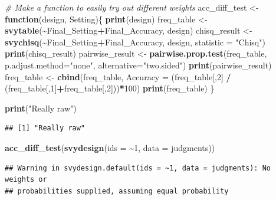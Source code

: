 \documentclass[
]{article}
\newenvironment{Shaded}{\begin{snugshade}}{\end{snugshade}}
\newcommand{\AttributeTok}[1]{\textcolor[rgb]{0.13,0.29,0.53}{#1}}
\newcommand{\CommentTok}[1]{\textcolor[rgb]{0.56,0.35,0.01}{\textit{#1}}}
\newcommand{\ControlFlowTok}[1]{\textcolor[rgb]{0.13,0.29,0.53}{\textbf{#1}}}
\newcommand{\DecValTok}[1]{\textcolor[rgb]{0.00,0.00,0.81}{#1}}
\newcommand{\FunctionTok}[1]{\textcolor[rgb]{0.13,0.29,0.53}{\textbf{#1}}}
\newcommand{\NormalTok}[1]{#1}
\newcommand{\OtherTok}[1]{\textcolor[rgb]{0.56,0.35,0.01}{#1}}
\newcommand{\SpecialCharTok}[1]{\textcolor[rgb]{0.81,0.36,0.00}{\textbf{#1}}}
\newcommand{\StringTok}[1]{\textcolor[rgb]{0.31,0.60,0.02}{#1}}
\begin{document}
\begin{Shaded}
\begin{Highlighting}[]
\CommentTok{\# Make a function to easily try out different weights}
\NormalTok{acc\_diff\_test }\OtherTok{\textless{}{-}} \ControlFlowTok{function}\NormalTok{(design, Setting)\{}
  \FunctionTok{print}\NormalTok{(design)}
\NormalTok{  freq\_table }\OtherTok{\textless{}{-}} \FunctionTok{svytable}\NormalTok{(}\SpecialCharTok{\textasciitilde{}}\NormalTok{Final\_Setting}\SpecialCharTok{+}\NormalTok{Final\_Accuracy, design)}
\NormalTok{  chisq\_result }\OtherTok{\textless{}{-}} \FunctionTok{svychisq}\NormalTok{(}\SpecialCharTok{\textasciitilde{}}\NormalTok{Final\_Setting}\SpecialCharTok{+}\NormalTok{Final\_Accuracy, design, }\AttributeTok{statistic =} \StringTok{"Chisq"}\NormalTok{)}
  \FunctionTok{print}\NormalTok{(chisq\_result)}
\NormalTok{  pairwise\_result }\OtherTok{\textless{}{-}} \FunctionTok{pairwise.prop.test}\NormalTok{(freq\_table, }\AttributeTok{p.adjust.method=}\StringTok{"none"}\NormalTok{, }\AttributeTok{alternative=}\StringTok{"two.sided"}\NormalTok{)}
  \FunctionTok{print}\NormalTok{(pairwise\_result)}
\NormalTok{  freq\_table }\OtherTok{\textless{}{-}} \FunctionTok{cbind}\NormalTok{(freq\_table, }\AttributeTok{Accuracy =}\NormalTok{ (freq\_table[,}\DecValTok{2}\NormalTok{] }\SpecialCharTok{/}\NormalTok{ (freq\_table[,}\DecValTok{1}\NormalTok{]}\SpecialCharTok{+}\NormalTok{freq\_table[,}\DecValTok{2}\NormalTok{]))}\SpecialCharTok{*}\DecValTok{100}\NormalTok{)}
  \FunctionTok{print}\NormalTok{(freq\_table)}
\NormalTok{\}}

\FunctionTok{print}\NormalTok{(}\StringTok{"Really raw"}\NormalTok{)}
\end{Highlighting}
\end{Shaded}

\begin{verbatim}
## [1] "Really raw"
\end{verbatim}

\begin{Shaded}
\begin{Highlighting}[]
\FunctionTok{acc\_diff\_test}\NormalTok{(}\FunctionTok{svydesign}\NormalTok{(}\AttributeTok{ids =} \SpecialCharTok{\textasciitilde{}}\DecValTok{1}\NormalTok{, }\AttributeTok{data =}\NormalTok{ judgments))}
\end{Highlighting}
\end{Shaded}

\begin{verbatim}
## Warning in svydesign.default(ids = ~1, data = judgments): No weights or
## probabilities supplied, assuming equal probability
\end{verbatim}
\end{document}
